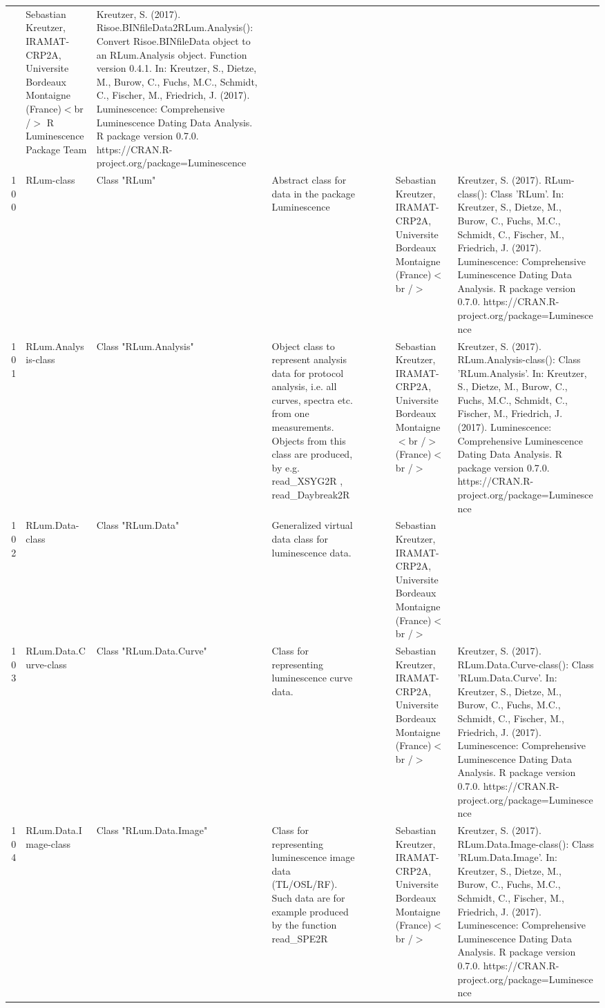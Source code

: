 \begin{table}[ht]
\begin{tabular}{rllllllll}
 & Sebastian Kreutzer, IRAMAT-CRP2A, Universite Bordeaux Montaigne (France)$<$br /$>$  R Luminescence Package Team & Kreutzer, S. (2017). Risoe.BINfileData2RLum.Analysis(): Convert Risoe.BINfileData object to an RLum.Analysis object. Function version 0.4.1. In: Kreutzer, S., Dietze, M., Burow, C., Fuchs, M.C., Schmidt, C., Fischer, M., Friedrich, J. (2017). Luminescence: Comprehensive Luminescence Dating Data Analysis. R package version 0.7.0. https://CRAN.R-project.org/package=Luminescence
 \\ 
  100 & RLum-class & Class  "RLum" & Abstract class for data in the package Luminescence &  &  &  & Sebastian Kreutzer, IRAMAT-CRP2A, Universite Bordeaux Montaigne (France)$<$br /$>$ & Kreutzer, S. (2017). RLum-class(): Class 'RLum'. In: Kreutzer, S., Dietze, M., Burow, C., Fuchs, M.C., Schmidt, C., Fischer, M., Friedrich, J. (2017). Luminescence: Comprehensive Luminescence Dating Data Analysis. R package version 0.7.0. https://CRAN.R-project.org/package=Luminescence
 \\ 
  101 & RLum.Analysis-class & Class  "RLum.Analysis" & Object class to represent analysis data for protocol analysis, i.e. all curves, spectra etc. from one measurements. Objects from this class are produced, by e.g.  read\_XSYG2R , read\_Daybreak2R &  &  &  & Sebastian Kreutzer, IRAMAT-CRP2A, Universite Bordeaux Montaigne$<$br /$>$ (France)$<$br /$>$ & Kreutzer, S. (2017). RLum.Analysis-class(): Class 'RLum.Analysis'. In: Kreutzer, S., Dietze, M., Burow, C., Fuchs, M.C., Schmidt, C., Fischer, M., Friedrich, J. (2017). Luminescence: Comprehensive Luminescence Dating Data Analysis. R package version 0.7.0. https://CRAN.R-project.org/package=Luminescence
 \\ 
  102 & RLum.Data-class & Class  "RLum.Data" & Generalized virtual data class for luminescence data. &  &  &  & Sebastian Kreutzer, IRAMAT-CRP2A, Universite Bordeaux Montaigne (France)$<$br /$>$ &  \\ 
  103 & RLum.Data.Curve-class & Class  "RLum.Data.Curve" & Class for representing luminescence curve data. &  &  &  & Sebastian Kreutzer, IRAMAT-CRP2A, Universite Bordeaux Montaigne (France)$<$br /$>$ & Kreutzer, S. (2017). RLum.Data.Curve-class(): Class 'RLum.Data.Curve'. In: Kreutzer, S., Dietze, M., Burow, C., Fuchs, M.C., Schmidt, C., Fischer, M., Friedrich, J. (2017). Luminescence: Comprehensive Luminescence Dating Data Analysis. R package version 0.7.0. https://CRAN.R-project.org/package=Luminescence
 \\ 
  104 & RLum.Data.Image-class & Class  "RLum.Data.Image" & Class for representing luminescence image data (TL/OSL/RF). Such data are for example produced by the function  read\_SPE2R &  &  &  & Sebastian Kreutzer, IRAMAT-CRP2A, Universite Bordeaux Montaigne (France)$<$br /$>$ & Kreutzer, S. (2017). RLum.Data.Image-class(): Class 'RLum.Data.Image'. In: Kreutzer, S., Dietze, M., Burow, C., Fuchs, M.C., Schmidt, C., Fischer, M., Friedrich, J. (2017). Luminescence: Comprehensive Luminescence Dating Data Analysis. R package version 0.7.0. https://CRAN.R-project.org/package=Luminescence

\end{tabular}
\end{table}
